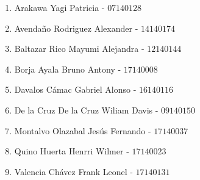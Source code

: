 \begin{enumerate}
	\item Arakawa Yagi Patricia - $07140128$
	\item Avendaño Rodriguez Alexander - $14140174$
	\item Baltazar Rico Mayumi Alejandra - $12140144$
	\item Borja Ayala Bruno Antony - $17140008$
	\item Davalos Cámac Gabriel Alonso - $16140116$
	\item De la Cruz De la Cruz Wiliam Davis - $09140150$
	\item Montalvo Olazabal Jesús Fernando - $17140037$
	\item Quino Huerta Henrri Wilmer - $17140023$
	\item Valencia Chávez Frank Leonel - $17140131$
\end{enumerate}
